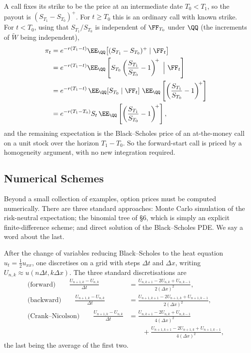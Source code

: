 \begin{example}
	A  call fixes its strike to be the price at an intermediate date $T_0 < T_1$, so the payout is $(S_{T_1}-S_{T_0})^+$. For $t\geq T_0$ this is an ordinary call with known strike. For $t<T_0$, using that $S_{T_1}/S_{T_0}$ is independent of $\FF_{T_0}$ under $\QQ$ (the increments of $\tilde W$ being independent),
	\begin{align*}
		\pi_t &= e^{-r(T_1-t)}\EE_\QQ\big[(S_{T_1}-S_{T_0})^+\mid\FF_t\big]\\
		&= e^{-r(T_1-t)}\EE_\QQ\left[S_{T_0}\left(\frac{S_{T_1}}{S_{T_0}} - 1\right)^{\!+}\ \Big|\ \FF_t\right]\\
		&= e^{-r(T_1-t)}\,\EE_\QQ[S_{T_0}\mid\FF_t]\ \EE_\QQ\left[\left(\frac{S_{T_1}}{S_{T_0}}-1\right)^{\!+}\right]\\
		&= e^{-r(T_1 - T_0)}S_t\,\EE_\QQ\left[\left(\frac{S_{T_1}}{S_{T_0}}-1\right)^{\!+}\right],
	\end{align*}
	and the remaining expectation is the Black--Scholes price of an at-the-money call on a unit stock over the horizon $T_1 - T_0$. So the forward-start call is priced by a homogeneity argument, with no new integration required.
\end{example}

\subsection{Numerical Schemes}

Beyond a small collection of examples, option prices must be computed numerically. There are three standard approaches: Monte Carlo simulation of the risk-neutral expectation; the binomial tree of \S6, which is simply an explicit finite-difference scheme; and direct solution of the Black--Scholes PDE. We say a word about the last.

After the change of variables reducing Black--Scholes to the heat equation $u_t = \tfrac12u_{xx}$, one discretises on a grid with steps $\Delta t$ and $\Delta x$, writing $U_{n,k}\approx u(n\Delta t, k\Delta x)$. The three standard discretisations are
\begin{align*}
	\text{(forward)}\qquad \frac{U_{n+1,k}-U_{n,k}}{\Delta t} &= \frac{U_{n,k+1}-2U_{n,k}+U_{n,k-1}}{2(\Delta x)^2},\\
	\text{(backward)}\qquad\frac{U_{n+1,k}-U_{n,k}}{\Delta t} &= \frac{U_{n+1,k+1}-2U_{n+1,k}+U_{n+1,k-1}}{2(\Delta x)^2},\\
	\text{(Crank--Nicolson)}\qquad \frac{U_{n+1,k}-U_{n,k}}{\Delta t} &= \frac{U_{n,k+1}-2U_{n,k}+U_{n,k-1}}{4(\Delta x)^2}\\
	&\qquad{}+ \frac{U_{n+1,k+1}-2U_{n+1,k}+U_{n+1,k-1}}{4(\Delta x)^2},
\end{align*}
the last being the average of the first two.

